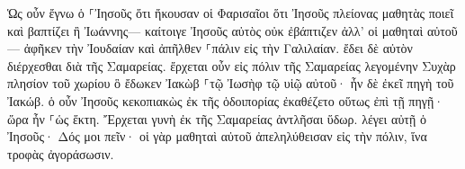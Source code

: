 \documentclass{openreader}
\begin{document}
Ὡς οὖν ἔγνω ὁ ⸀Ἰησοῦς ὅτι ἤκουσαν οἱ Φαρισαῖοι ὅτι Ἰησοῦς πλείονας μαθητὰς ποιεῖ καὶ βαπτίζει ἢ Ἰωάννης— 
καίτοιγε Ἰησοῦς αὐτὸς οὐκ ἐβάπτιζεν ἀλλ’ οἱ μαθηταὶ αὐτοῦ— 
ἀφῆκεν τὴν Ἰουδαίαν καὶ ἀπῆλθεν ⸀πάλιν εἰς τὴν Γαλιλαίαν. 
ἔδει δὲ αὐτὸν διέρχεσθαι διὰ τῆς Σαμαρείας. 
ἔρχεται οὖν εἰς πόλιν τῆς Σαμαρείας λεγομένην Συχὰρ πλησίον τοῦ χωρίου ὃ ἔδωκεν Ἰακὼβ ⸀τῷ Ἰωσὴφ τῷ υἱῷ αὐτοῦ· 
ἦν δὲ ἐκεῖ πηγὴ τοῦ Ἰακώβ. ὁ οὖν Ἰησοῦς κεκοπιακὼς ἐκ τῆς ὁδοιπορίας ἐκαθέζετο οὕτως ἐπὶ τῇ πηγῇ· ὥρα ἦν ⸀ὡς ἕκτη. 
Ἔρχεται γυνὴ ἐκ τῆς Σαμαρείας ἀντλῆσαι ὕδωρ. λέγει αὐτῇ ὁ Ἰησοῦς· Δός μοι πεῖν· 
οἱ γὰρ μαθηταὶ αὐτοῦ ἀπεληλύθεισαν εἰς τὴν πόλιν, ἵνα τροφὰς ἀγοράσωσιν. 
\end{document}
